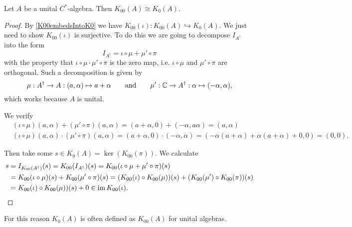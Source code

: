 \begin{proposition}
Let $A$ be a unital $C^*$-algebra. Then $K_{00}(A) \cong K_0(A)$.
\end{proposition}
\begin{proof}
By \ref{K00embedsIntoK0} we have $K_{00}(\iota): K_{00}(A) \hookrightarrow K_{0}(A)$. We just need to show $K_{00}(\iota)$ is surjective. To do this we are going to decompose $I_{A^\dagger}$ into the form
\[ I_{A^\dagger} = \iota\circ \mu + \mu'\circ \pi \]
with the property that $\iota\circ \mu \cdot \mu'\circ \pi$ is the zero map, i.e. $\iota\circ \mu$ and $\mu'\circ \pi$ are orthogonal. Such a decomposition is given by
\[ \mu: A^\dagger \to A: (a,\alpha) \mapsto a+\alpha \qquad \text{and}\qquad \mu': \mathbb{C} \to A^\dagger: \alpha \mapsto (-\alpha, \alpha),\]
which works because $A$ is unital.

We verify
\begin{align*}
&(\iota\circ \mu)(a,\alpha) + (\mu'\circ \pi)(a,\alpha) = (a+\alpha, 0) + (-\alpha, a\alpha) = (a,\alpha) \\
&(\iota\circ \mu)(a,\alpha) \cdot (\mu'\circ \pi)(a,\alpha) = (a+\alpha,0) \cdot (-\alpha, \alpha) = (-\alpha(a+\alpha) + \alpha(a+\alpha) + 0,0) = (0,0).
\end{align*}

Then take some $s\in K_0(A) = \ker(K_{00}(\pi))$. We calculate
\begin{align*}
s &= I_{K_{00}(A^\dagger)}(s) = K_{00}(I_{A^\dagger})(s) = K_{00}(\iota\circ \mu + \mu'\circ \pi)(s) \\
&= K_{00}(\iota\circ \mu)(s) + K_{00}(\mu'\circ \pi)(s) = (K_{00}(\iota)\circ K_{00}(\mu))(s) + (K_{00}(\mu')\circ K_{00}(\pi))(s) \\
&= K_{00}(\iota)\circ K_{00}(\mu))(s) + 0 \in \operatorname{im} K_{00}(\iota).
\end{align*}
\end{proof}
For this reason $K_0(A)$ is often defined as $K_{00}(A)$ for unital algebras.

